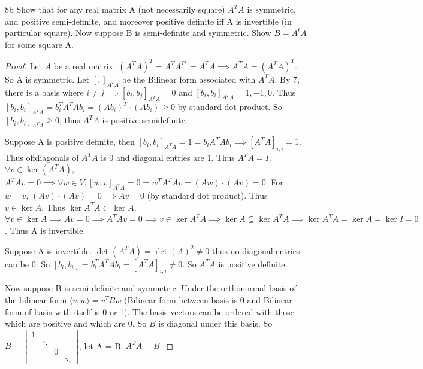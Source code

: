 \documentclass{article}
\newcommand{\angles}[1]{\langle #1 \rangle}
\begin{document}
\begin{PROB}{8b}\label{Problem 8b.}
    Show that for any real matrix A (not necessarily square) $A^T A$ is symmetric, and positive semi-definite, and moreover positive definite iff A is invertible (in particular square).  Now suppose B is semi-definite and symmetric. Show $B = A^t A$ for some square A. 
\end{PROB}
\begin{proof}
    Let $A$ be a real matrix. $(A^T A) ^T = A^T A^{T^T} = A^T A \implies A^T A = (A^T A) ^T$. So A is symmetric. Let $[ , ]_{A^TA}$ be the Bilinear form associated with $A^TA$. By 7, there is a basis where $ i \neq j \implies [b_i, b_j]_{A^TA} = 0$ and $[b_i, b_i]_{A^TA} = 1, -1, 0$. Thus $[b_i, b_i]_{A^TA} = b_i^TA^TAb_i = (Ab_i)^T \cdot (Ab_i) \geq 0$ by standard dot product. So $[b_i, b_i]_{A^TA} \geq 0$, thus $A^TA$ is positive semidefinite.
    
    Suppose A is positive definite, then $[b_i, b_i]_{A^TA} = 1 = b_i A^TA b_i \implies [A^T A]_{i, i} = 1$. Thus offdiagonals of $A^TA$ is 0 and diagonal entries are 1. Thus $A^TA = I$. $\forall v \in \ker(A^TA)$, $A^TAv = 0 \implies \forall w \in V, [w, v]_{A^TA} = 0 = w^T A^T A v = (Aw) \cdot (Av) = 0$. For $w = v$, $(Av) \cdot (Av) = 0 \implies Av = 0$ (by standard dot product). Thus $v \in \ker A$. Thus $\ker A^TA \subset \ker A$. $\forall v \in \ker A \implies Av = 0 \implies A^T A v = 0 \implies v \in \ker A^T A \implies \ker A \subseteq \ker A^TA \implies \ker A^TA = \ker A = \ker I = 0  $. Thus A is invertible.
    
    Suppose A is invertible. $\det(A^TA) = \det(A)^2 \neq 0$ thus no diagonal entries can be 0. So $[b_i, b_i] = b_i^T A^T A b_i = [A^T A]_{i, i} \neq 0$. So $A^TA$ is positive definite.
    
    Now suppose B is semi-definite and symmetric. Under the orthonormal basis of the bilinear form $\angles{v, w} = v^T B w$ (Bilinear form between basis is 0 and Bilinear form of basis with itself is 0 or 1). The basis vectors can be ordered with those which are positive and which are 0. So $B$ is diagonal under this basis. So $B = \begin{bmatrix}
        1 \\
        & \ddots \\
        & & 0 \\
        & & & \ddots
    \end{bmatrix}$, let A = B. $A^TA = B$.  
\end{proof}
\end{document}
